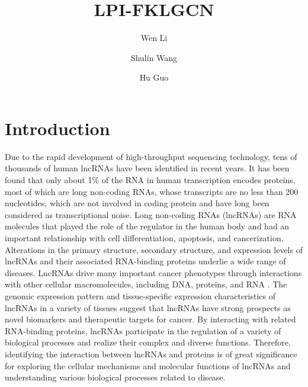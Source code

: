 \documentclass[fleqn,10pt]{wlscirep}
\title{LPI-FKLGCN}
\author[1]{Wen Li}
\author[1,*]{Shulin Wang}
\author[1]{Hu Guo}
\affil[1]{Hunan University, College of Computer Science and Electronic Engineering,Hunan, Changsha, 410082, China}
\affil[*]{corresponding.smartforesting@163.com}
\begin{document}
\flushbottom
\maketitle
%
%
\thispagestyle{empty}

\section*{Introduction}
Due to the rapid development of high-throughput sequencing technology, tens of thousands of human lncRNAs have been identified in recent years\cite{Chen2013}. It has been found that only about 1\% of the RNA in human transcription encodes proteins, most of which are long non-coding RNAs, whose transcripts are no less than 200 nucleotides, which are not involved in coding protein and have long been considered as transcriptional noise\cite{Engreitz2016}. Long non-coding RNAs (lncRNAs) are RNA molecules that played the role of the regulator in the human body and had an important relationship with cell differentiation, apoptosis, and cancerization\cite{Harrow2012}. Alterations in the primary structure, secondary structure, and expression levels of lncRNAs and their associated RNA-binding proteins underlie a wide range of diseases\cite{Li2014,Wapinski2011}. LncRNAs drive many important cancer phenotypes through interactions with other cellular macromolecules, including DNA, proteins, and RNA \cite{Schmitt2016}. The genomic expression pattern and tissue-specific expression characteristics of lncRNAs in a variety of tissues suggest that lncRNAs have strong prospects as novel biomarkers and therapeutic targets for cancer\cite{Chen2017}. By interacting with related RNA-binding proteins, lncRNAs participate in the regulation of a variety of biological processes and realize their complex and diverse functions\cite{Djebali2012}. Therefore, identifying the interaction between lncRNAs and proteins is of great significance for exploring the cellular mechanisms and molecular functions of lncRNAs and understanding various biological processes related to disease.
\end{document}
